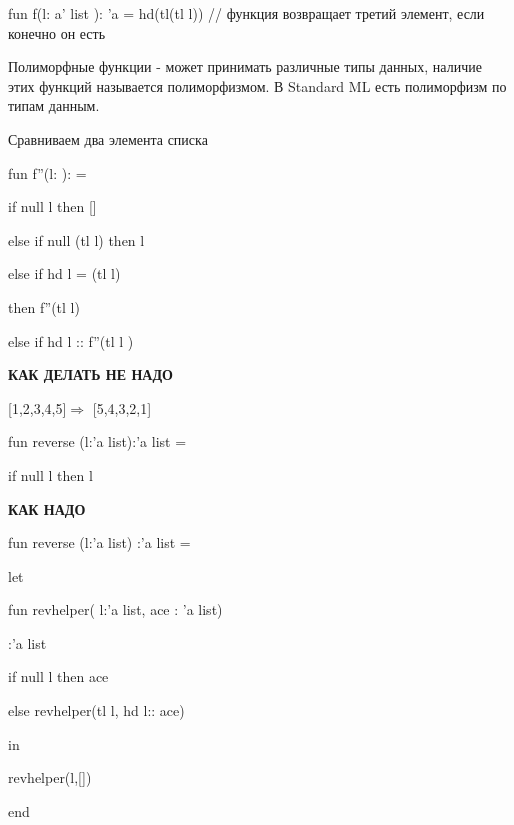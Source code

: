 \documentclass{article}
\begin{document}
fun f(l: a' list ): 'a = hd(tl(tl l)) // функция возвращает 
третий элемент, если конечно он есть


Полиморфные функции - может принимать различные типы данных, наличие этих функций
называется полиморфизмом.
В Standard ML есть полиморфизм по типам данным.


\vspace{5mm}

Сравниваем два элемента списка

fun f''(l:\hspace{10mm} ):  \hspace{10mm}    =

if null l then []

else if null (tl l) then l

else if hd l = (tl l)

then f''(tl l)

else if hd l :: f''(tl l )

\vspace{15mm}

\textbf{КАК ДЕЛАТЬ НЕ НАДО}

[1,2,3,4,5]$\Rightarrow$ [5,4,3,2,1]

fun reverse (l:'a list):'a list = 

if null l then l
\vspace{20mm}

\textbf{КАК НАДО}

fun reverse (l:'a list) :'a list = 

let

fun revhelper( l:'a list, ace : 'a list)

\hspace{50mm} :'a list

if null l then ace

else revhelper(tl l, hd l:: ace)

in 

revhelper(l,[])

end
\end{document}
